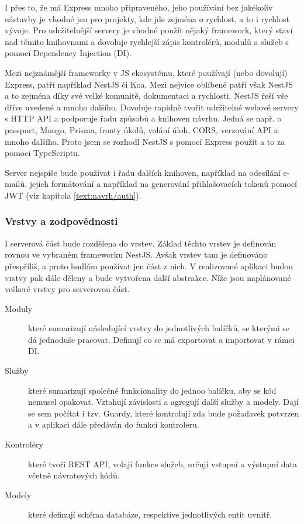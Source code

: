 I přes to, že má Express mnoho připraveného, jeho používání bez jakékoliv nástavby je vhodné jen pro projekty, kde jde zejména o rychlost, a to i rychlost vývoje.
Pro udržitelnější servery je vhodné použít nějaký framework, který staví nad těmito knihovnami a dovoluje rychlejší zápis kontrolérů, modulů a služeb s pomocí Dependency Injection (DI).

Mezi nejznámější frameworky v JS ekosystému, které používají (nebo dovolují) Express, patří například NestJS či Koa.
Mezi nejvíce oblíbené patří však NestJS a to zejména díky své velké komunitě, dokumentaci a rychlosti.
NestJS řeší vše dříve uvedené a mnoho dalšího.
Dovoluje rapidně tvořit udržitelné webové servery s HTTP API a podporuje řadu způsobů a knihoven návrhu.
Jedná se např. o passport, Mongo, Prisma, fronty úkolů, volání úloh, CORS, verzování API a mnoho dalšího.
Proto jsem se rozhodl NestJS s pomocí Express použít a to za pomoci TypeScriptu.

Server nejspíše bude používat i řadu dalších knihoven, například na odesílání e-mailů, jejich formátování a například na generování přihlašovacích tokenů pomocí JWT (viz kapitola \ref{text:navrh/auth}).

\subsubsection{Vrstvy a zodpovědnosti}

I serverová část bude rozdělena do vrstev. 
Základ těchto vrstev je definován rovnou ve vybraném frameworku NestJS.
Avšak vrstev tam je definováno přespříliš, a proto hodlám používat jen část z nich.
V realizované aplikaci budou vrstvy pak dále děleny a bude vytvořena další abstrakce.
Níže jsou naplánované veškeré vrstvy pro serverovou část.

\begin{description}
    \item[Moduly] které sumarizují následující vrstvy do jednotlivých balíčků, se kterými se dá jednoduše pracovat. Definují co se má exportovat a importovat v rámci DI.
    \item[Služby] které sumarizují společné funkcionality do jednoo balíčku, aby se kód nemusel opakovat. Vztahují závislosti a agregují další služby a modely. Dají se sem počítat i tzv. Guardy, které kontrolují zda bude požadavek potvrzen a v aplikaci dále předáván do funkcí kontroleru.
    \item[Kontroléry] které tvoří REST API, volají funkce služeb, určují vstupní a výstupní data včetně návratových kódů.
    \item[Modely] které definují schéma databáze, respektive jednotlivých entit uvnitř.
\end{description}


